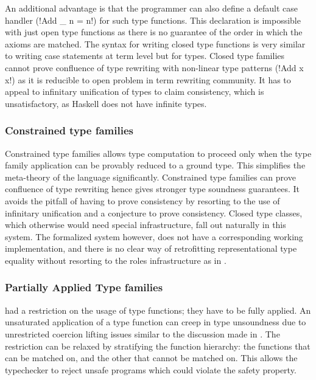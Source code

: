 \documentclass[screen,nonacm,manuscript,review]{acmart} %
\begin{document}
An additional advantage is that the programmer can also define a default case handler (!Add _ n = n!) for such type functions. This declaration is impossible with just open type functions as there is no guarantee of the order in which the axioms are matched. The syntax for writing closed type functions is very similar to writing case statements at term level but for types. Closed type families cannot prove confluence of type rewriting with non-linear type patterns (!Add x x!) as it is reducible to open problem in term rewriting community\cite{mizuhito_rta_1995}. It has to appeal to infinitary unification\cite{jaffar_efficient_1984} of types to claim consistency, which is unsatisfactory, as Haskell does not have infinite types.

\subsubsection{Constrained type families}
Constrained type families\cite{morris_typefamilies_2017} allows type computation to proceed only when the type family application can be provably reduced to a ground type. This simplifies the meta-theory of the language significantly. Constrained type families can prove confluence of type rewriting hence gives stronger type soundness guarantees. It avoids the pitfall of having to prove consistency by resorting to the use of infinitary unification and a conjecture to prove consistency. Closed type classes, which otherwise would need special infrastructure, fall out naturally in this system. The formalized system however, does not have a corresponding  working implementation, and there is no clear way of retrofitting representational type equality without resorting to the roles infrastructure as in \SFR.

\subsubsection{Partially Applied Type families}
\SFC had a restriction on the usage of type functions; they have to
be fully applied. An unsaturated application of a type function can
creep in type unsoundness due to unrestricted coercion lifting issues
similar to the discussion made in \SFP. The restriction can be
relaxed by stratifying the function
hierarchy\cite{kiss_higher-order_2019}: the functions that can be
matched on, and the other that cannot be matched on. This allows the
typechecker to reject unsafe programs which could violate the
safety property.
\end{document}
